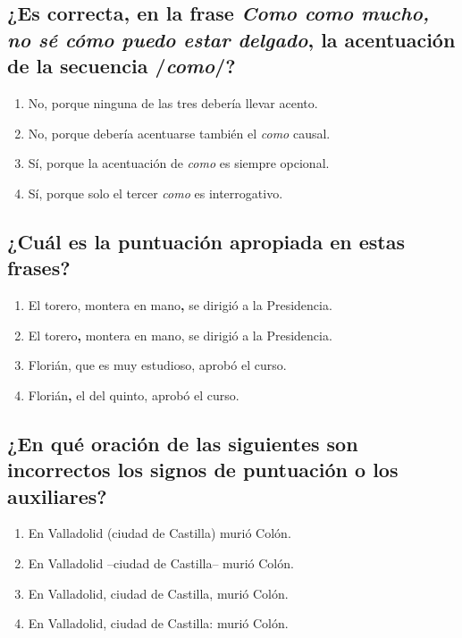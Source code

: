 \documentclass[12pt, a4paper, oneside]{report}
\begin{document}
            \subsection{¿Es correcta, en la frase \textit{Como como mucho, no sé cómo puedo estar delgado},
            la acentuación de la secuencia /\textit{como}/?}
                \begin{enumerate}
                    \item No, porque ninguna de las tres debería llevar acento.
                    \item No, porque debería acentuarse también el \textit{como} causal.
                    \item Sí, porque la acentuación de \textit{como} es siempre opcional.
                    \item \color{verde}Sí, porque solo el tercer \textit{como} es interrogativo\color{negro}.
                \end{enumerate}
            \subsection{¿Cuál es la puntuación apropiada en estas frases?}
                \begin{enumerate}
                    \item El torero, montera en mano\color{verde}\textbf{,}\color{negro} \;se dirigió a la
                    Presidencia.
                    \item El torero\color{verde}\textbf{,}\color{negro} \;montera en mano, se dirigió a la
                    Presidencia.
                    \item Florián, que es muy estudioso, aprobó el curso.
                    \item Florián\color{verde}\textbf{,}\color{negro} \;el del quinto, aprobó el curso.
                \end{enumerate}
                \clearpage
            \subsection{¿En qué oración de las siguientes son incorrectos los signos de puntuación o los
            auxiliares?}
                \begin{enumerate}
                    \item En Valladolid (ciudad de Castilla) murió Colón.
                    \item En Valladolid --ciudad de Castilla-- murió Colón.
                    \item En Valladolid, ciudad de Castilla, murió Colón.
                    \item \color{verde}En Valladolid, ciudad de Castilla: murió Colón\color{negro}.
                \end{enumerate}
\end{document}
